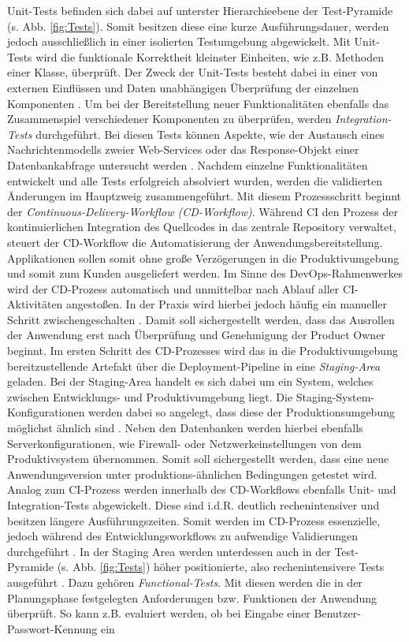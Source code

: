 \vspace*{-10mm}
Unit-Tests befinden sich dabei auf unterster Hierarchieebene der Test-Pyramide (s. Abb. \ref*{fig:Tests}). Somit besitzen diese eine kurze Ausführungsdauer, werden jedoch ausschließlich in einer isolierten Testumgebung abgewickelt. Mit Unit-Tests wird die funktionale Korrektheit kleinster Einheiten, wie z.B. Methoden einer Klasse, über\-prüft. Der Zweck der Unit-Tests besteht dabei in einer von externen Einflüssen und Daten unabhängigen Überprüfung der einzelnen Komponenten \cite[Kap. 2]{Hambling.2015}. Um bei der Bereitstellung neuer Funktionalitäten ebenfalls das Zusammenspiel verschiedener Komponenten zu überprüfen, werden \textit{Integration-Tests} durchgeführt. Bei diesen Tests können Aspekte, wie der Austausch eines Nachrichtenmodells zweier Web-Services oder das Response-Objekt einer Datenbankabfrage untersucht werden \cite[Kap. 2]{Hambling.2015}. Nachdem einzelne Funktionalitäten entwickelt und alle Tests erfolgreich absolviert wurden, werden die validierten Än\-derungen im Hauptzweig zusammengeführt. Mit diesem Prozessschritt beginnt der \textit{Continuous-Delivery-Workflow (\acs{CD}-Workflow)}.  Während CI den Prozess der kontinuierlichen Integration des Quellcodes in das zentrale Repository verwaltet, steuert der CD-Workflow die Automatisierung der Anwendungsbereitstellung. Applikationen sollen somit ohne große Verzögerungen in die Produktivumgebung und somit zum Kunden ausgeliefert werden. Im Sinne des DevOps-Rahmenwerkes wird der CD-Prozess automatisch und unmittelbar nach Ablauf aller CI-Aktivitäten angestoßen. In der Praxis wird hierbei jedoch häufig ein manueller Schritt zwischengeschalten \cite[20]{Halstenberg.2020}. Damit soll sichergestellt werden, dass das Ausrollen der Anwendung erst nach Überprüfung und Genehmigung der Product Owner beginnt. Im ersten Schritt des CD-Prozesses wird das in die Produktivumgebung bereitzustellende Artefakt über die Deployment-Pipeline in eine \textit{Staging-Area} geladen. Bei der Staging-Area handelt es sich dabei um ein System, welches zwischen Entwicklungs- und Produktivumgebung liegt. Die Staging-System-Konfigurationen werden dabei so angelegt, dass diese der Produktionsumgebung möglichst ähnlich sind \cite[Kap. 1.3]{Labouardy.2021}. Neben den Datenbanken werden hierbei ebenfalls Serverkonfigurationen, wie Firewall- oder Netzwerkeinstellungen von dem Produktivsystem übernommen. Somit soll sichergestellt werden, dass eine neue Anwendungsversion unter produktions-ähnlichen Bedingungen getestet wird. Analog zum CI-Prozess werden innerhalb des CD-Workflows ebenfalls Unit- und Integration-Tests abgewickelt. Diese sind i.d.R. deutlich rechenintensiver und besitzen längere Ausführungszeiten. Somit werden im CD-Prozess essenzielle, jedoch während des Entwicklungsworkflows zu aufwendige Validierungen durchgeführt \cite[20]{Halstenberg.2020}. In der Staging Area werden unterdessen auch in der Test-Pyramide (s. Abb. \ref*{fig:Tests}) höher positionierte, also rechenintensivere Tests ausgeführt \cite[Kap. 2]{Hambling.2015}. Dazu gehören \textit{Functional-Tests}. Mit diesen werden die in der Planungsphase festgelegten Anforderungen bzw. Funktionen der Anwendung überprüft. So kann z.B. evaluiert werden, ob bei Eingabe einer Benutzer-Passwort-Kennung ein 
